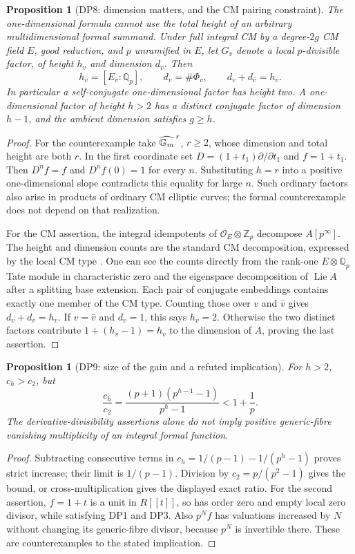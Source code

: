 \documentclass[11pt,a4paper]{article}
\newtheorem{proposition}[theorem]{Proposition}
\theoremstyle{definition}\newtheorem{remark}[theorem]{Remark}
\newcommand{\Z}{\mathbb Z}\newcommand{\Q}{\mathbb Q}\newcommand{\F}{\mathbb F}
\newcommand{\Lie}{\operatorname{Lie}}\newcommand{\Dist}{\operatorname{Dist}}
\begin{document}
\begin{proposition}[DP8: dimension matters, and the CM pairing constraint]\label{DP8}
The one-dimensional formula cannot use the total height of an arbitrary multidimensional formal summand. Under full integral CM by a degree-$2g$ CM field $E$, good reduction, and $p$ unramified in $E$, let $G_v$ denote a local $p$-divisible factor, of height $h_v$ and dimension $d_v$. Then
\[
 h_v=[E_v:\Q_p],\qquad d_v=\#\Phi_v,\qquad
 d_v+d_{\bar v}=h_v.
\]
In particular a self-conjugate one-dimensional factor has height two. A one-dimensional factor of height $h>2$ has a distinct conjugate factor of dimension $h-1$, and the ambient dimension satisfies $g\ge h$.
\end{proposition}
\begin{proof}
For the counterexample take $\widehat{\mathbb G_m}^{\,r}$, $r\ge2$, whose dimension and total height are both $r$. In the first coordinate set $D=(1+t_1)\partial/\partial t_1$ and $f=1+t_1$. Then $D^nf=f$ and $D^nf(0)=1$ for every $n$. Substituting $h=r$ into a positive one-dimensional slope contradicts this equality for large $n$. Such ordinary factors also arise in products of ordinary CM elliptic curves; the formal counterexample does not depend on that realization.

For the CM assertion, the integral idempotents of $\mathcal O_E\otimes\Z_p$ decompose $A[p^\infty]$. The height and dimension counts are the standard CM decomposition, expressed by the local CM type \cite[\S5, definition p.~106, (10*) and Theorem 3 p.~107]{Tate352}. One can see the counts directly from the rank-one $E\otimes\Q_p$ Tate module in characteristic zero and the eigenspace decomposition of $\Lie A$ after a splitting base extension. Each pair of conjugate embeddings contains exactly one member of the CM type. Counting those over $v$ and $\bar v$ gives $d_v+d_{\bar v}=h_v$. If $v=\bar v$ and $d_v=1$, this says $h_v=2$. Otherwise the two distinct factors contribute $1+(h_v-1)=h_v$ to the dimension of $A$, proving the last assertion.
\end{proof}

\begin{proposition}[DP9: size of the gain and a refuted implication]\label{DP9}
For $h>2$, $c_h>c_2$, but
\[
 \frac{c_h}{c_2}=\frac{(p+1)(p^{h-1}-1)}{p^h-1}<1+\frac1p.
\]
The derivative-divisibility assertions alone do not imply positive generic-fibre vanishing multiplicity of an integral formal function.
\end{proposition}
\begin{proof}
Subtracting consecutive terms in $c_h=1/(p-1)-1/(p^h-1)$ proves strict increase; their limit is $1/(p-1)$. Division by $c_2=p/(p^2-1)$ gives the bound, or cross-multiplication gives the displayed exact ratio. For the second assertion, $f=1+t$ is a unit in $R[[t]]$, so has order zero and empty local zero divisor, while satisfying DP1 and DP3. Also $p^Nf$ has valuations increased by $N$ without changing its generic-fibre divisor, because $p^N$ is invertible there. These are counterexamples to the stated implication.
\end{proof}
\end{document}
